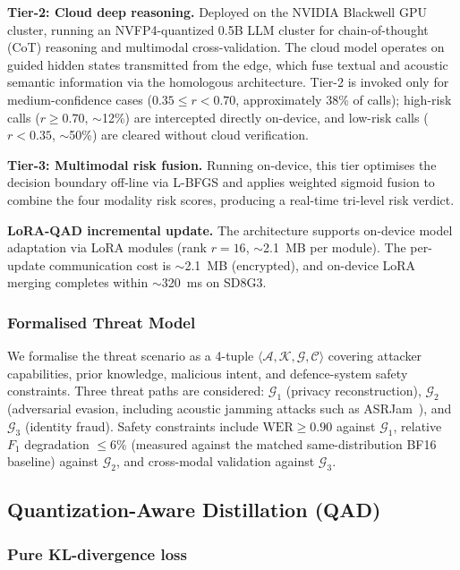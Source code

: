 \documentclass[final,5p,times,number]{elsarticle}
\begin{document}
\textbf{Tier-2: Cloud deep reasoning.} Deployed on the NVIDIA Blackwell GPU cluster, running an NVFP4-quantized 0.5B LLM cluster for chain-of-thought (CoT) reasoning and multimodal cross-validation. The cloud model operates on guided hidden states transmitted from the edge, which fuse textual and acoustic semantic information via the homologous architecture. Tier-2 is invoked only for medium-confidence cases ($0.35\le r<0.70$, approximately 38\% of calls); high-risk calls ($r\ge 0.70$, $\sim$12\%) are intercepted directly on-device, and low-risk calls ($r<0.35$, $\sim$50\%) are cleared without cloud verification.

\textbf{Tier-3: Multimodal risk fusion.} Running on-device, this tier optimises the decision boundary off-line via L-BFGS and applies weighted sigmoid fusion to combine the four modality risk scores, producing a real-time tri-level risk verdict.

\medskip
\noindent\textbf{LoRA-QAD incremental update.} The architecture supports on-device model adaptation via LoRA modules (rank $r=16$, $\sim$2.1~MB per module). The per-update communication cost is $\sim$2.1~MB (encrypted), and on-device LoRA merging completes within $\sim$320~ms on SD8G3.

\subsubsection{Formalised Threat Model}

We formalise the threat scenario as a 4-tuple $\langle \mathcal{A}, \mathcal{K}, \mathcal{G}, \mathcal{C} \rangle$ covering attacker capabilities, prior knowledge, malicious intent, and defence-system safety constraints. Three threat paths are considered: $\mathcal{G}_1$ (privacy reconstruction), $\mathcal{G}_2$ (adversarial evasion, including acoustic jamming attacks such as ASRJam~\cite{19}), and $\mathcal{G}_3$ (identity fraud). Safety constraints include $\text{WER}\ge 0.90$ against $\mathcal{G}_1$, relative $F_1$ degradation $\le 6\%$ (measured against the matched same-distribution BF16 baseline) against $\mathcal{G}_2$, and cross-modal validation against $\mathcal{G}_3$.

\subsection{Quantization-Aware Distillation (QAD)}
\subsubsection{Pure KL-divergence loss}
\end{document}
